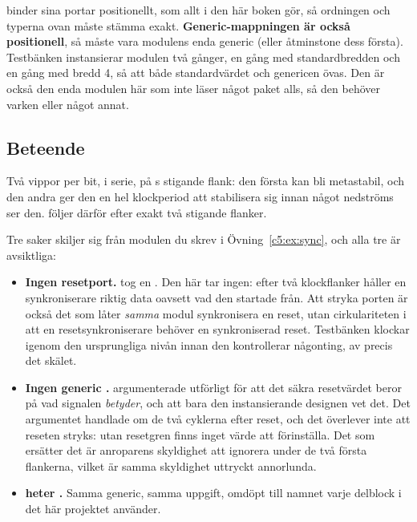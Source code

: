  binder sina portar positionellt, som allt i den här boken gör, så ordningen och
typerna ovan måste stämma exakt. \textbf{Generic-mappningen är också positionell}, så 
måste vara modulens enda generic (eller åtminstone dess första). Testbänken instansierar modulen två
gånger, en gång med standardbredden och en gång med bredd 4, så att både standardvärdet och genericen
övas. Den är också den enda modulen här som inte läser något paket alls, så den behöver varken
 eller något annat.

\subsection{Beteende}
\label{c12:sub:mpbehav}

Två vippor per bit, i serie, på s stigande flank: den första kan bli metastabil, och den
andra ger den en hel klockperiod att stabilisera sig innan något nedströms ser den.
 följer därför  efter exakt två stigande flanker.

Tre saker skiljer sig från modulen  du skrev i Övning~\ref{c5:ex:sync}, och alla tre är
avsiktliga:
\begin{itemize}
  \item \textbf{Ingen resetport.}  tog en . Den här tar ingen: efter två
    klockflanker håller en synkroniserare riktig data oavsett vad den startade från. Att stryka
    porten är också det som låter \emph{samma} modul synkronisera en reset, utan cirkulariteten i att
    en resetsynkroniserare behöver en synkroniserad reset. Testbänken klockar igenom den
    ursprungliga nivån innan den kontrollerar någonting, av precis det skälet.
  \item \textbf{Ingen generic .}  argumenterade utförligt för att det
    säkra resetvärdet beror på vad signalen \emph{betyder}, och att bara den instansierande designen
    vet det. Det argumentet handlade om de två cyklerna efter reset, och det överlever inte att
    reseten stryks: utan resetgren finns inget värde att förinställa. Det som ersätter det är
    anroparens skyldighet att ignorera  under de två första flankerna, vilket är samma
    skyldighet uttryckt annorlunda.
  \item \textbf{ heter .} Samma generic, samma uppgift, omdöpt till namnet
    varje delblock i det här projektet använder.
\end{itemize}


